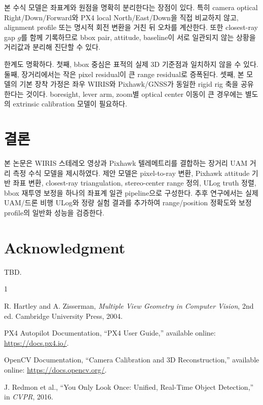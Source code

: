 \documentclass[10pt,conference]{IEEEtran}
\begin{document}
본 수식 모델은 좌표계와 원점을 명확히 분리한다는 장점이 있다.
특히 camera optical Right/Down/Forward와 PX4 local North/East/Down을 직접 비교하지 않고, alignment profile 또는 명시적 회전 변환을 거친 뒤 오차를 계산한다.
또한 closest-ray gap $g$를 함께 기록하므로 bbox pair, attitude, baseline이 서로 일관되지 않는 상황을 거리값과 분리해 진단할 수 있다.

한계도 명확하다.
첫째, bbox 중심은 표적의 실제 3D 기준점과 일치하지 않을 수 있다.
둘째, 장거리에서는 작은 pixel residual이 큰 range residual로 증폭된다.
셋째, 본 모델의 기본 장착 가정은 좌우 WIRIS와 Pixhawk/GNSS가 동일한 rigid rig 축을 공유한다는 것이다.
boresight, lever arm, zoom별 optical center 이동이 큰 경우에는 별도의 extrinsic calibration 모델이 필요하다.

\section{결론}

본 논문은 WIRIS 스테레오 영상과 Pixhawk 텔레메트리를 결합하는 장거리 UAM 거리 측정 수식 모델을 제시하였다.
제안 모델은 pixel-to-ray 변환, Pixhawk attitude 기반 좌표 변환, closest-ray triangulation, stereo-center range 정의, ULog truth 정렬, bbox 재투영 보정을 하나의 좌표계 일관 pipeline으로 구성한다.
추후 연구에서는 실제 UAM/드론 비행 ULog와 정량 실험 결과를 추가하여 range/position 정확도와 보정 profile의 일반화 성능을 검증한다.

\section*{Acknowledgment}

TBD.

\begin{thebibliography}{1}

R. Hartley and A. Zisserman, \emph{Multiple View Geometry in Computer Vision}, 2nd ed. Cambridge University Press, 2004.

PX4 Autopilot Documentation, ``PX4 User Guide,'' available online: \url{https://docs.px4.io/}.

OpenCV Documentation, ``Camera Calibration and 3D Reconstruction,'' available online: \url{https://docs.opencv.org/}.

J. Redmon et al., ``You Only Look Once: Unified, Real-Time Object Detection,'' in \emph{CVPR}, 2016.

\end{thebibliography}
\end{document}
